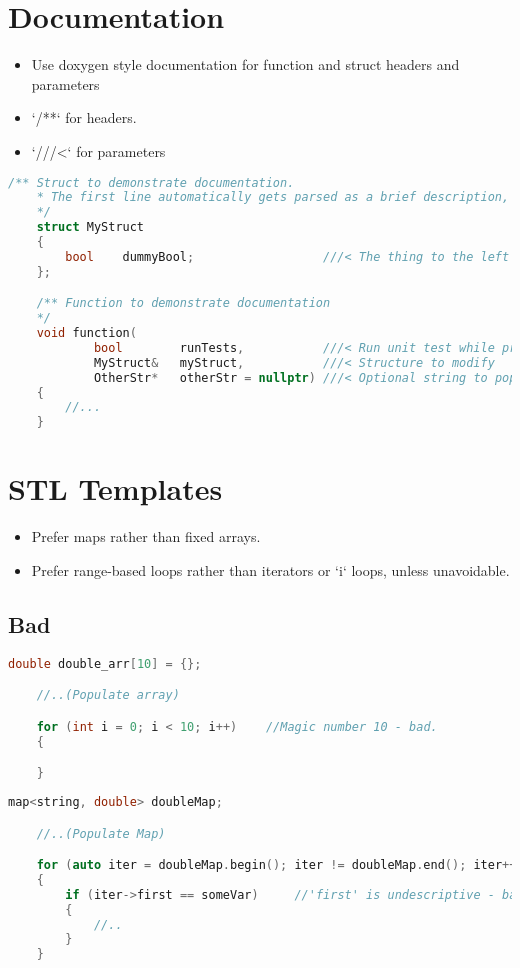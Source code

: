 \section{Documentation}
\begin{itemize}
\item Use doxygen style documentation for function and struct headers and parameters
\item `/**`  for headers.
\item `///<` for parameters
\end{itemize}
\begin{lstlisting}[language=c++]
    /** Struct to demonstrate documentation.
    * The first line automatically gets parsed as a brief description, but more detailed descriptions are possible too.
    */
    struct MyStruct
    {
        bool    dummyBool;                  ///< The thing to the left is documented here
    };

    /** Function to demonstrate documentation
    */
    void function(
            bool        runTests,           ///< Run unit test while processing
            MyStruct&   myStruct,           ///< Structure to modify
            OtherStr*	otherStr = nullptr)	///< Optional string to populate
    {
    	//...
    }
\end{lstlisting}

\section{STL Templates}
\begin{itemize}
\item Prefer maps rather than fixed arrays.
\item Prefer range-based loops rather than iterators or `i` loops, unless unavoidable.
\end{itemize}

\subsection{Bad}
\begin{lstlisting}[language=c++]
    double double_arr[10] = {};

    //..(Populate array)

    for (int i = 0; i < 10; i++)    //Magic number 10 - bad.
    {

    }
\end{lstlisting}
%
\begin{lstlisting}[language=c++]
    map<string, double> doubleMap;

    //..(Populate Map)

    for (auto iter = doubleMap.begin(); iter != doubleMap.end(); iter++)   //long, undescriptive - bad
    {
    	if (iter->first == someVar)     //'first' is undescriptive - bad
    	{
    		//..
    	}
    }
\end{lstlisting}
